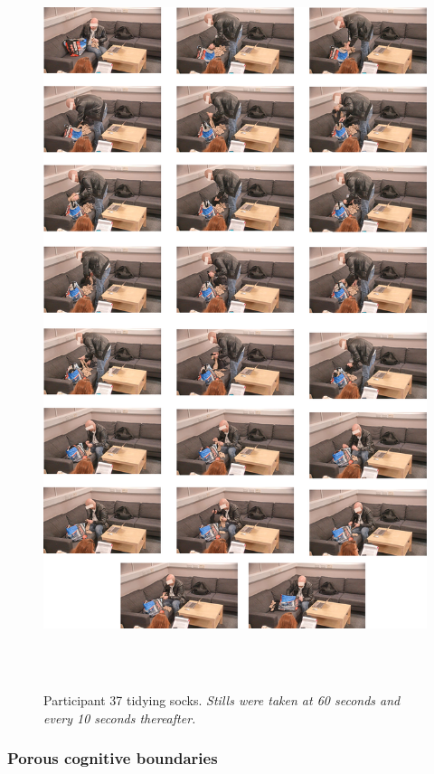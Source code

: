\documentclass[twocolumn, serif, empirical, authordate]{jote-article}
\begin{document}
\begin{figure}
\centering
\includegraphics[width=5.25905in,height=8.51806in]{media/image4.png} 
\caption{Participant 37 tidying socks. \emph{Stills were taken at 60 seconds and every 10 seconds thereafter.}}
\label{fig:figure4}
\end{figure}



\subsubsection*{Porous cognitive boundaries}
\end{document}
